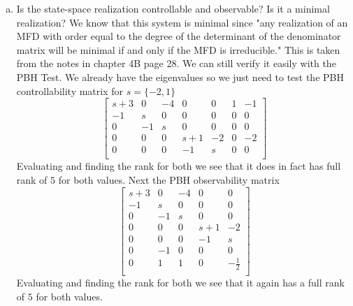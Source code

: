 \documentclass{article}
\begin{document}
\begin{enumerate}[(a)]
\item Is the state-space realization controllable and observable? Is it a minimal realization?
\newline
We know that this system is minimal since "any realization of an MFD with order equal to the degree of the determinant of the denominator matrix will be minimal if and only if the MFD is irreducible."
This is taken from the notes in chapter 4B page 28.
We can still verify it easily with the PBH Test.
\newline
We already have the eigenvalues so we just need to test the PBH controllability matrix for $s = \{-2,1\}$
$$
\begin{bmatrix}
s+3 & 0 & -4 & 0 & 0 & 1 & -1 \\
-1 & s & 0 & 0 & 0 & 0 & 0 \\
0 & -1 & s & 0 & 0 & 0 & 0 \\
0 & 0 & 0 & s+1 & -2 & 0 & -2 \\
0 & 0 & 0 & -1 & s & 0 & 0 \\
\end{bmatrix}
$$
Evaluating and finding the rank for both we see that it does in fact has full rank of $5$ for both values.
\newline
Next the PBH observability matrix
$$
\begin{bmatrix}
s+3 & 0 & -4 & 0 & 0 \\
-1 & s & 0 & 0 & 0 \\
0 & -1 & s & 0 & 0 \\
0 & 0 & 0 & s+1 & -2 \\
0 & 0 & 0 & -1 & s \\
0 & -1 & 0 & 0 & 0 \\
0 & 1 & 1 & 0 & -\frac{1}{2} \\
\end{bmatrix}
$$
Evaluating and finding the rank for both we see that it again has a full rank of $5$ for both values.
\newline
{}


\end{enumerate}
\end{document}
